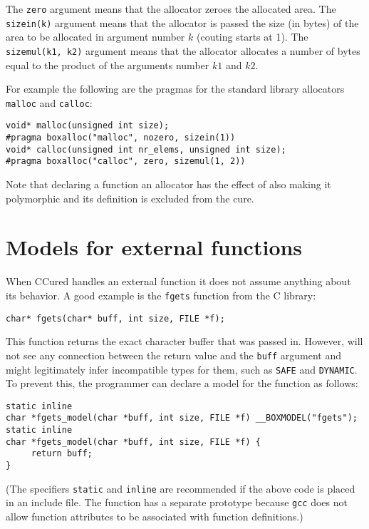\documentclass{book}
\def\t#1{{\tt #1}}
\begin{document}
 The \t{zero} argument means that the allocator zeroes the allocated area. The
\t{sizein(k)} argument means that the allocator is passed the size (in bytes)
of the area to be allocated in argument number $k$ (couting starts at 1). The
\t{sizemul(k1, k2)} argument means that the allocator allocates a number of
bytes equal to the product of the arguments number $k1$ and $k2$. 

 For example the following are the pragmas for the standard library allocators
\t{malloc} and \t{calloc}:
\begin{verbatim}
void* malloc(unsigned int size);
#pragma boxalloc("malloc", nozero, sizein(1))
void* calloc(unsigned int nr_elems, unsigned int size);
#pragma boxalloc("calloc", zero, sizemul(1, 2))
\end{verbatim}

 Note that declaring a function an allocator has the effect of also making it
polymorphic and its definition is excluded from the cure. 

  \section{Models for external functions}\label{sec-model}

 When CCured handles an external function it does not assume anything about
its behavior. A good example is the \t{fgets} function from the C library:
\begin{verbatim}
char* fgets(char* buff, int size, FILE *f);
\end{verbatim}

 This function returns the exact character buffer that was passed in. However,
will not see any connection between the return value and the \t{buff} argument
and might legitimately infer incompatible types for them, such as \t{SAFE} and
\t{DYNAMIC}. To prevent this, the programmer can declare a model for the
function as follows:

\begin{verbatim}
static inline
char *fgets_model(char *buff, int size, FILE *f) __BOXMODEL("fgets");
static inline
char *fgets_model(char *buff, int size, FILE *f) {
     return buff;
}
\end{verbatim}

 (The specifiers \t{static} and \t{inline} are recommended if the above code
 is placed in an include file. The function has a separate prototype because
 \t{gcc} does not allow function attributes to be associated with function
 definitions.)
\end{document}
